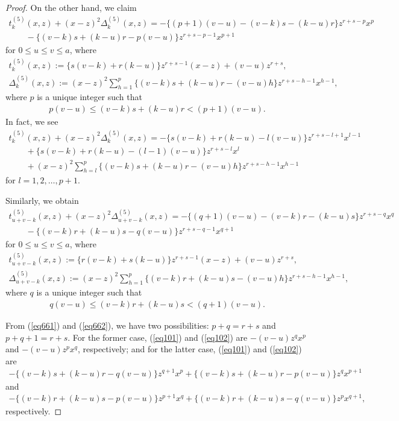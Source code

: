 \documentclass[pdftex]{sigma}
\numberwithin{equation}{section}
\theoremstyle{definition}
\begin{document}
\begin{proof}
On the other hand, we claim
\begin{gather}
 t^{(5)}_k(x,z)+(x-z)^2\Delta_k^{(5)}(x,z) =-\{(p+1)(v-u)-(v-k)s-(k-u)r\}z^{r+s-p}x^p\nonumber\\
 \qquad{} -\{(v-k)s+(k-u)r-p(v-u)\}z^{r+s-p-1}x^{p+1}\label{eq101}
\end{gather}
for $0\leq u\leq v\leq a$, where
\begin{gather*}t_k^{(5)}(x,z):=\{s(v-k)+r(k-u)\}z^{r+s-1}(x-z)+(v-u)z^{r+s},\\
\Delta_k^{(5)}(x,z):=(x-z)^2\sum_{h=1}^p\{(v-k)s+(k-u)r-(v-u)h\}z^{r+s-h-1}x^{h-1},\end{gather*}
where $p$ is a unique integer such that
\begin{gather}\label{eq661}
p(v-u)\leq (v-k)s+(k-u)r <(p+1)(v-u).
\end{gather}
In fact, we see
\begin{gather*}
 t_k^{(5)}(x,z)+(x-z)^2\Delta_k^{(5)}(x,z) =-\{s(v-k)+r(k-u)-l(v-u)\}z^{r+s-l+1}x^{l-1}\\
 \qquad{} + \{s(v-k)+r(k-u)-(l-1)(v-u)\}z^{r+s-l}x^l\\
 \qquad{} +(x-z)^2\sum_{h=l}^p\{(v-k)s+(k-u)r-(v-u)h\}z^{r+s-h-1}x^{h-1}
\end{gather*}
for $l=1,2,\dots,p+1$.

Similarly, we obtain
\begin{gather}
 t^{(5)}_{u+v-k}(x,z)+(x-z)^2\Delta_{u+v-k}^{(5)}(x,z) =-\{(q+1)(v-u)-(v-k)r-(k-u)s\}z^{r+s-q}x^q\nonumber\\
 \qquad{} -\{(v-k)r+(k-u)s-q(v-u)\}z^{r+s-q-1}x^{q+1}\label{eq102}
\end{gather}
for $0\leq u\leq v\leq a$, where
\begin{gather*}t_{u+v-k}^{(5)}(x,z):=\{r(v-k)+s(k-u)\}z^{r+s-1}(x-z)+(v-u)z^{r+s},\\
\Delta_{u+v-k}^{(5)}(x,z):=(x-z)^2\sum_{h=1}^p\{(v-k)r+(k-u)s-(v-u)h\}z^{r+s-h-1}x^{h-1},\end{gather*}
where $q$ is a unique integer such that
\begin{gather}\label{eq662}
q(v-u)\leq (v-k)r+(k-u)s <(q+1)(v-u).
\end{gather}

From (\ref{eq661}) and (\ref{eq662}), we have two possibilities: $p+q=r+s$ and $p+q+1=r+s$. For the former case, (\ref{eq101}) and (\ref{eq102}) are $-(v-u)z^qx^p$ and $-(v-u)z^px^q$, respectively; and for the latter case, (\ref{eq101}) and (\ref{eq102}) are
\begin{gather*}-\{(v-k)s+(k-u)r-q(v-u)\}z^{q+1}x^p+\{(v-k)s+(k-u)r-p(v-u)\}z^{q}x^{p+1}\end{gather*}
and{\samepage
\begin{gather*}-\{(v-k)r+(k-u)s-p(v-u)\}z^{p+1}x^q+\{(v-k)r+(k-u)s-q(v-u)\}z^{p}x^{q+1},\end{gather*}
respectively.}


\end{proof}
\end{document}
